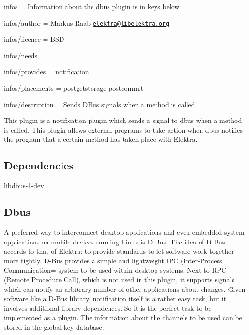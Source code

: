 
\begin{DoxyItemize}
\item infos = Information about the dbus plugin is in keys below
\item infos/author = Markus Raab \href{mailto:elektra@libelektra.org}{\tt elektra@libelektra.\+org}
\item infos/licence = B\+S\+D
\item infos/needs =
\item infos/provides = notification
\item infos/placements = postgetstorage postcommit
\item infos/description = Sends D\+Bus signals when a method is called
\end{DoxyItemize}

This plugin is a notification plugin which sends a signal to dbus when a method is called. This plugin allows external programs to take action when dbus notifies the program that a certain method has taken place with Elektra.

\subsection*{Dependencies}


\begin{DoxyItemize}
\item {\ttfamily libdbus-\/1-\/dev}
\end{DoxyItemize}

\subsection*{Dbus}

A preferred way to interconnect desktop applications and even embedded system applications on mobile devices running Linux is D-\/\+Bus. The idea of D-\/\+Bus accords to that of Elektra\+: to provide standards to let software work together more tightly. D-\/\+Bus provides a simple and lightweight I\+P\+C (Inter-\/\+Process Communication= system to be used within desktop systems. Next to R\+P\+C (Remote Procedure Call), which is not used in this plugin, it supports signals which can notify an arbitrary number of other applications about changes. Given software like a D-\/\+Bus library, notification itself is a rather easy task, but it involves additional library dependences. So it is the perfect task to be implemented as a plugin. The information about the channels to be used can be stored in the global key database.

